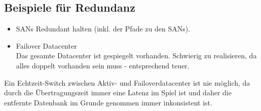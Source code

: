 \subsection{Beispiele für Redundanz}\label{sec:bsp_redundanz}
\begin{itemize}
	\item SANs Redundant halten (inkl. der Pfade zu den SANs).
	\item Failover Datacenter \\ 
		Das gesamte Datacenter ist gespiegelt vorhanden. Schwierig zu realisieren, da alles doppelt vorhanden sein muss - entsprechend teuer.
\end{itemize}
Ein Echtzeit-Switch zwischen Aktiv- und Failoverdatacenter ist nie möglich, da durch die Übertragungszeit immer eine Latenz im Spiel ist und daher die entfernte Datenbank im Grunde genommen immer inkonsistent ist.